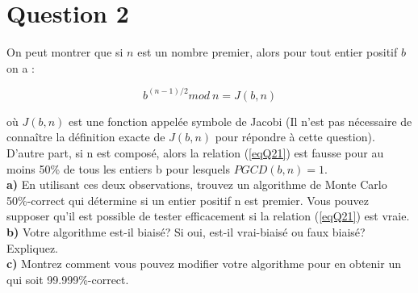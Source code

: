 \documentclass[devoir4.tex]{subfiles}
\begin{document}
\section*{Question 2}
On peut montrer que si \(n\) est un nombre premier, alors pour tout entier positif \(b\) on a :

\begin{equation}
	b^{(n-1)/2} mod \: n = J(b,n)
	\label{eqQ21}
\end{equation}

où \(J(b, n)\) est une fonction appelée symbole de Jacobi (Il n'est pas nécessaire de connaître la définition exacte de \(J(b, n)\) pour répondre à cette question). \\

D'autre part, si n est composé, alors la relation (\ref{eqQ21}) est fausse pour au moins 50\% de tous les entiers b pour lesquels \(PGCD(b, n) = 1\). \\

\textbf{a)} En utilisant ces deux observations, trouvez un algorithme de Monte Carlo 50\%-correct qui détermine si un entier positif n est premier. Vous pouvez supposer qu’il est possible de tester efficacement si la relation (\ref{eqQ21}) est vraie. \\ 

\textbf{b)} Votre algorithme est-il biaisé? Si oui, est-il vrai-biaisé ou faux biaisé? Expliquez. \\

\textbf{c)} Montrez comment vous pouvez modifier votre algorithme pour en obtenir un qui soit 99.999\%-correct.
\end{document}

